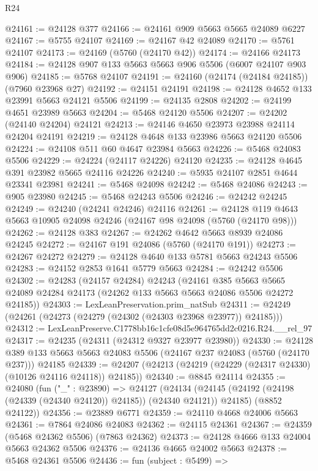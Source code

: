 \begin{lexlean}{R24}
\begin{coremodule}
@24161 := @24128 @377
@24166 := @24161 @909 @5663 @5665 @24089 @6227
@24167 := @5755 @24107
@24169 := @24167 @42 @24089
@24170 := @5761 @24107
@24173 := @24169 (@5760 (@24170 @42))
@24174 := @24166 @24173
@24184 := @24128 @907 @133 @5663 @5663 @906 @5506 (@6007 @24107 @903 @906)
@24185 := @5768 @24107
@24191 := @24160 (@24174 (@24184 @24185)) (@7960 @23968 @27)
@24192 := @24151 @24191
@24198 := @24128 @4652 @133 @23991 @5663 @24121 @5506
@24199 := @24135 @2808
@24202 := @24199 @4651 @23989 @5663
@24204 := @5468 @24120 @5506
@24207 := @24202 (@24140 @24204) @24121
@24213 := @24146 @4650 @23973 @23988 @24114 @24204 @24191
@24219 := @24128 @4648 @133 @23986 @5663 @24120 @5506
@24224 := @24108 @511 @60 @4647 @23984 @5663
@24226 := @5468 @24083 @5506
@24229 := @24224 (@24117 @24226) @24120
@24235 := @24128 @4645 @391 @23982 @5665 @24116 @24226
@24240 := @5935 @24107 @2851 @4644 @23341 @23981
@24241 := @5468 @24098
@24242 := @5468 @24086
@24243 := @905 @23980
@24245 := @5468 @24243 @5506
@24246 := @24242 @24245
@24249 := @24240 (@24241 @24246) @24116
@24261 := @24128 @119 @4643 @5663 @10905 @24098 @24246 (@24167 @98 @24098 (@5760 (@24170 @98)))
@24262 := @24128 @383
@24267 := @24262 @4642 @5663 @8939 @24086 @24245
@24272 := @24167 @191 @24086 (@5760 (@24170 @191))
@24273 := @24267 @24272
@24279 := @24128 @4640 @133 @5781 @5663 @24243 @5506
@24283 := @24152 @2853 @1641 @5779 @5663
@24284 := @24242 @5506
@24302 := @24283
    (@24157 @24284)
    @24243
    (@24161
      @385
      @5663
      @5665
      @24089
      @24284
      @24173
      (@24262 @133 @5663 @5663 @24086 @5506 @24272 @24185))
@24303 := LexLeanPreservation.prim_natSub
@24311 := @24249 (@24261 (@24273 (@24279 (@24302 (@24303 @23968 @23977)) @24185)))
@24312 := LexLeanPreserve.C1778bb16c1cfe08d5e964765dd2c0216.R24.__rel_97
@24317 := @24235 (@24311 (@24312 @9327 @23977 @23980))
@24330 := @24128
    @389
    @133
    @5663
    @5663
    @24083
    @5506
    (@24167 @237 @24083 (@5760 (@24170 @237)))
    @24185
@24339 := @24207 (@24213 (@24219 (@24229 (@24317 @24330) (@10126 @24116 @24118)) @24185))
@24340 := @8845 @24114
@24355 := @24080
    (fun ("_" : @23890) =>
    @24127
      (@24134 (@24145 (@24192 (@24198 (@24339 (@24340 @24120)) @24185)) (@24340 @24121)) @24185)
      (@8852 @24122))
@24356 := @23889 @6771
@24359 := @24110 @4668 @24006 @5663
@24361 := @7864 @24086 @24083
@24362 := @24115 @24361
@24367 := @24359 (@5468 @24362 @5506) (@7863 @24362)
@24373 := @24128 @4666 @133 @24004 @5663 @24362 @5506
@24376 := @24136 @4665 @24002 @5663
@24378 := @5468 @24361 @5506
@24436 := fun (subject : @5499) =>

\end{coremodule}
\end{lexlean}
